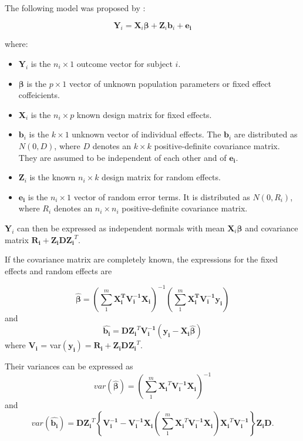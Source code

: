 \documentclass{article}
\numberwithin{equation}{section}
\begin{document}
The following model was proposed by \cite{laird1982random}:	 

\begin{equation}
\bm{Y}_i = \bm{X}_i \bm{\beta}+\bm{Z}_i\bm{b}_i+\bm{e_i}
\end{equation}

where:

\begin{itemize}[leftmargin=1.5in]
	\item $\bm{Y}_i $ is the $n_i \times 1$ outcome vector for subject $i$.
	\item $\bm{\beta}$ is the $p \times 1$ vector of unknown population parameters or fixed effect coffeicients.
	\item $\bm{X}_i$ is the $n_i \times p$ known design matrix for fixed effects.
	\item $\bm{b}_i$ is the $k \times 1$ unknown vector of individual effects. The $\bm{b}_i$ are distributed as $N(0, D)$, where $D$ denotes an $k \times k$ positive-definite covariance matrix. They are assumed to be independent of each other and of $\bm{e_i}$.
	\item $\bm{Z}_i$ is the known $n_i \times k$ design matrix for random effects.
    \item $\bm{e_i}$ is the $n_i \times 1$ vector of random error terms. It is distributed as $N(0, R_i)$, where $R_i$ denotes an $n_i \times n_i$ positive-definite covariance matrix.  
\end{itemize}
$\bm{Y}_i $ can then be expressed as independent normals with mean $\bm{X}_i \bm{\beta}$ and covariance matrix $\bm{R_i}+\bm{Z_i}\bm{D}\bm{Z_i}^T$.


If the covariance matrix are completely known, the expressions for the fixed effects and random effects are

\begin{equation} \label{eq:beta}
\hat{\bm{\beta}} = (\sum_1^m \bm{X_i^T}\bm{V_i^{-1}}\bm{X_i})^{-1}(\sum_1^m \bm{X_i^T}\bm{V_i^{-1}}\bm{y_i})
\end{equation} 
and
\begin{equation}\label{eq:b}
\hat{\bm{b_i}}=\bm{D}\bm{Z_i}^T\bm{V_i^{-1}}(\bm{y_i}-\bm{X_i}\hat{\bm{\beta}})
\end{equation} 
where $\bm{V_i}$ = var$(\bm{y_i}) = \bm{R_i}+\bm{Z_i}\bm{D}\bm{Z_i}^T$.

Their variances can be expressed as
\begin{equation}
var(\hat{\bm{\beta}}) = \left(\sum_1^m\bm{X_i}^T \bm{V_i^{-1}} \bm{X_i}\right)^{-1}
\end{equation}
and
\begin{equation}
var(\hat{\bm{b_i}}) = \bm{D} \bm{Z_i}^T \left\{\bm{V_i^{-1}}- \bm{V_i^{-1}}\bm{X_i}\left(\sum_1^m\bm{X_i}^T \bm{V_i^{-1}} \bm{X_i} \right)\bm{X_i}^T\bm{V_i^{-1}} \right\}\bm{Z_i}\bm{D}.
\end{equation}
\end{document}
